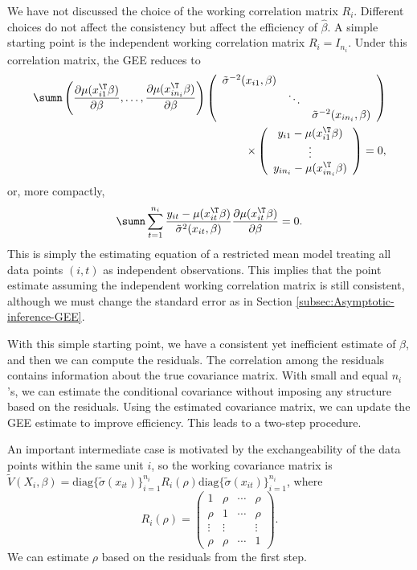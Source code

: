 We have not discussed the choice of the working correlation matrix
$R_i$. Different choices do not affect the consistency
but affect the efficiency of $\hat{\beta}$. A simple starting point
is the independent working correlation matrix $R_i = I_{n_i}$.
Under this correlation matrix, the GEE reduces to
\begin{eqnarray*}
\sumn \left(  \frac{ \partial  \mu(x_{i1}^{\T}\beta)}{\partial \beta},\ldots,  \frac{ \partial   \mu(x_{in_{i}}^{\T}\beta)}{\partial \beta} \right) 
\left(\begin{array}{ccc}
\tilde{\sigma}^{-2}(x_{i1}, \beta)\\
 & \ddots\\
 &  & \tilde{\sigma}^{-2}(x_{in_{i}}, \beta)
\end{array}\right) \\
\times 
\left(\begin{array}{c}
 y_{i1} -\mu(x_{i1}^{\T}\beta)\\
\vdots\\
 y_{in_{i}} -\mu(x_{in_{i}}^{\T}\beta)
\end{array}\right) =0,
\end{eqnarray*}
or, more compactly,
\begin{eqnarray}
\label{eq::independent-working-cov-gee}
\sumn\sum_{t=1}^{n_{i}}\frac{y_{it}-\mu(x_{it}^{\T}\beta)}{\tilde{\sigma}^{2}(x_{it}, \beta)}\frac{\partial\mu(x_{it}^{\T}\beta)}{\partial\beta}=0.
\end{eqnarray}
This is simply the estimating equation of a restricted mean model
treating all data points $(i,t)$ as independent observations. This
implies that the point estimate assuming the independent working correlation matrix is still consistent, although we must change the standard error
as in Section \ref{subsec:Asymptotic-inference-GEE}. 

With this simple starting point, we have a consistent yet inefficient
estimate of $\beta$, and then we can compute the residuals. The correlation
among the residuals contains information about the true covariance
matrix. With small and equal $n_{i}$'s, we can estimate the conditional
covariance without imposing any structure based on the residuals.
Using the estimated covariance matrix, we can update the GEE estimate
to improve efficiency. This leads to a two-step procedure. 

An important intermediate case is motivated by the exchangeability
of the data points within the same unit $i$, so the working covariance
matrix is $\tilde{V}(X_{i}, \beta)= \text{diag}\{\tilde{\sigma}(x_{it})\}_{i=1}^{n_i} R_i(\rho) \text{diag}\{\tilde{\sigma}(x_{it})\}_{i=1}^{n_i} $, where
\[
R_i(\rho) = \left(\begin{array}{cccc}
1 & \rho & \cdots & \rho\\
\rho & 1 & \cdots & \rho\\
\vdots & \vdots &  & \vdots\\
\rho & \rho & \cdots & 1
\end{array}\right) .
\]
We can estimate $\rho$ based on the residuals from the first step.

